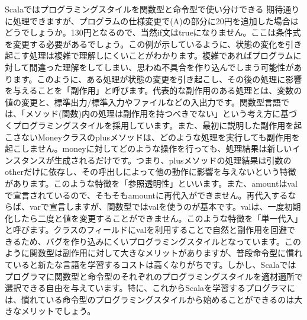 \begin{itembox}[l]{Scalaではプログラミングスタイルを関数型と命令型で使い分けできる}
{期待通りに処理できますが、プログラムの仕様変更で(A)の部分に20円を追加した場合はどうでしょうか。130円となるので、当然if文はtrueになりません。ここは条件式を変更する必要があるでしょう。この例が示しているように、状態の変化を引き起こす処理は複雑で理解しにくいことがわかります。複雑であればプログラムに対して間違った理解をしてしまい、思わぬ不具合を作り込んでしまう可能性があります。このように、ある処理が状態の変更を引き起こし、その後の処理に影響を与えることを「副作用」と呼びます。代表的な副作用のある処理とは、変数の値の変更と、標準出力/標準入力やファイルなどの入出力です。関数型言語では、「メソッド(関数)内の処理は副作用を持つべきでない」という考え方に基づくプログラミングスタイルを採用しています。また、最初に説明した副作用を起こさないMoneyクラスのplusメソッドは、どのような処理を実行しても副作用を起こしません。moneyに対してどのような操作を行っても、処理結果は新しいインスタンスが生成されるだけです。つまり、plusメソッドの処理結果は引数のotherだけに依存し、その呼出しによって他の動作に影響を与えないという特徴があります。このような特徴を「参照透明性」といいます。また、amountはvalで宣言されているので、そもそもamountに再代入ができません。再代入するならば、varで宣言しますが、関数型ではvalを使うのが基本です。valは、一度初期化したら二度と値を変更することができません。このような特徴を「単一代入」と呼びます。クラスのフィールドにvalを利用することで自然と副作用を回避できるため、バグを作り込みにくいプログラミングスタイルとなっています。このように関数型は副作用に対して大きなメリットがありますが、普段命令型に慣れていると新たな言語を学習するコストは高くなりがちです。しかし、Scalaではプログラマに関数型と命令型のそれぞれのプログラミングスタイルを適材適所で選択できる自由を与えています。特に、これからScalaを学習するプログラマには、慣れている命令型のプログラミングスタイルから始めることができるのは大きなメリットでしょう。}
\end{itembox}

